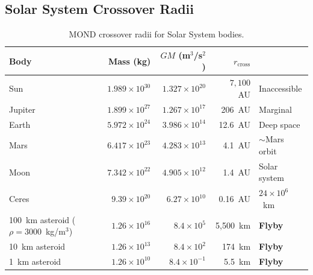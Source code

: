 \documentclass[11pt]{article}
\theoremstyle{definition}
\theoremstyle{remark}
\newcommand{\ee}[1]{\times10^{#1}}
\begin{document}
\subsection{Solar System Crossover Radii}

\begin{table}[H]
\centering
\small
\caption{MOND crossover radii for Solar System bodies.}
\label{tab:crossover-bodies}
\begin{tabular}{@{}lrrrl@{}}
\toprule
Body & Mass (kg) & $GM$ (m$^3$/s$^2$) & $r_{\mathrm{cross}}$ &  \\
\midrule
Sun & $1.989\ee{30}$ & $1.327\ee{20}$ & $7{,}100$~AU & Inaccessible \\
Jupiter & $1.899\ee{27}$ & $1.267\ee{17}$ & 206~AU & Marginal \\
Earth & $5.972\ee{24}$ & $3.986\ee{14}$ & 12.6~AU & Deep space \\
Mars & $6.417\ee{23}$ & $4.283\ee{13}$ & 4.1~AU & $\sim$Mars orbit \\
Moon & $7.342\ee{22}$ & $4.905\ee{12}$ & 1.4~AU & Solar system \\
Ceres & $9.39\ee{20}$ & $6.27\ee{10}$ & 0.16~AU & $24\ee{6}$~km \\
100~km asteroid ($\rho = 3000$~kg/m$^3$) & $1.26\ee{16}$ & $8.4\ee{5}$ & 5{,}500~km & \textbf{Flyby} \\
10~km asteroid & $1.26\ee{13}$ & $8.4\ee{2}$ & 174~km & \textbf{Flyby} \\
1~km asteroid & $1.26\ee{10}$ & $8.4\ee{-1}$ & 5.5~km & \textbf{Flyby} \\
\bottomrule
\end{tabular}
\end{table}
\end{document}
